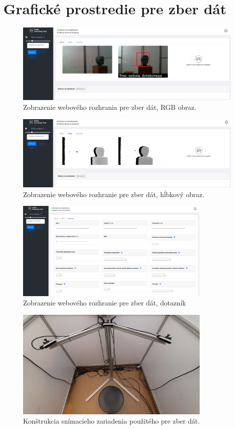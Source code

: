 \newpage
\section{Grafické prostredie pre zber dát} \label{sec:Priloha:HMI_WEB}

\begin{figure}[H]
	\centering
	\includegraphics[width=\textwidth]{figures/hmi_web1.png}
	\caption{Zobrazenie webového rozhrania pre zber dát, RGB obraz.}
	\label{fig:hmi_web:a}
\end{figure}

\begin{figure}[H]
	\centering
	\includegraphics[width=\textwidth]{figures/hmi_web2.png}
	\caption{Zobrazenie webového rozhranie pre zber dát, hĺbkový obraz.}
	\label{fig:hmi_web:b}
\end{figure}

\begin{figure}[H]
	\centering
	\includegraphics[width=0.85\textwidth]{figures/hmi_web3.png}
	\caption{Zobrazenie webového rozhranie pre zber dát, dotazník}
	\label{fig:hmi_web:c}
\end{figure}

\begin{figure}[H]
	\centering
	\includegraphics[width=0.85\textwidth]{figures/clinic_scaning.png}
	\caption{Konštrukcia snímacieho zariadenia použitého pre zber dát.}
	\label{fig:hmi_web:d}
\end{figure}
